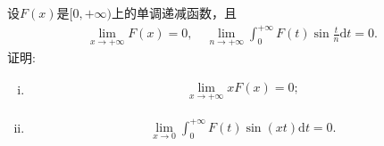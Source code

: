 \documentclass[../../main.tex]{subfiles}%
\begin{document}
\begin{example}
设$F(x)$是$[0,+\infty)$上的单调递减函数，且
\begin{align}
\lim\limits_{x \to +\infty} F(x) = 0,\quad
\lim\limits_{n \to +\infty} \int_0^{+\infty} F(t) \sin \frac{t}{n} \mathrm{d}t = 0.\label{eq::23945789023589028225}
\end{align}
证明:
\begin{enumerate}[(i)]
\item \begin{align}
\lim\limits_{x \to +\infty} xF(x) = 0;\label{eq::23945789023589028226}
\end{align}

\item \begin{align}
\lim\limits_{x \to 0} \int_0^{+\infty} F(t) \sin(xt) \mathrm{d}t = 0.\label{eq::23945789023589028227}
\end{align}
\end{enumerate}
\end{example}
\end{document}
